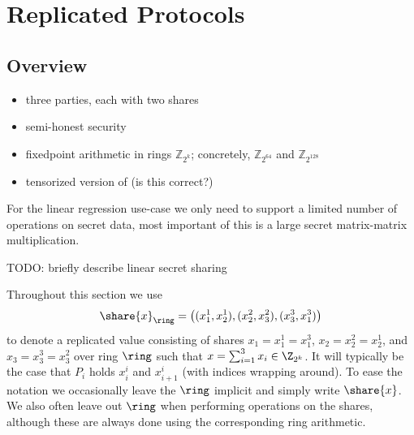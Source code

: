\section{Replicated Protocols}


\subsection{Overview}

\begin{itemize}
    \item three parties, each with two shares
    \item semi-honest security
    \item fixedpoint arithmetic in rings $\mathbb{Z}_{2^{k}}$; concretely, $\mathbb{Z}_{2^{64}}$ and $\mathbb{Z}_{2^{128}}$
    \item tensorized version of \cite{CCS:AFLNO16} (is this correct?)
\end{itemize}

For the linear regression use-case we only need to support a limited number of
operations on secret data, most important of this is a large secret matrix-matrix
multiplication.

TODO: briefly describe linear secret sharing

Throughout this section we use 
$$
\share{x}_\ring = \left( (x_1^1, x_2^1), (x_2^2, x_3^2), (x_3^3, x_1^3) \right)
$$ to denote a replicated value consisting of shares $x_1 = x_1^1 = x_1^3$, $x_2 = x_2^2 = x_2^1$, and $x_3 = x_3^3 = x_3^2$ over ring $\ring$ such that $x = \sum_{i=1}^3 x_i \in \Z_{2^k}$. It will typically be the case that $P_i$ holds $x_i^i$ and $x_{i+1}^i$ (with indices wrapping around). To ease the notation we occasionally leave the $\ring$ implicit and simply write $\share{x}$. We also often leave out $\ring$ when performing operations on the shares, although these are always done using the corresponding ring arithmetic.











